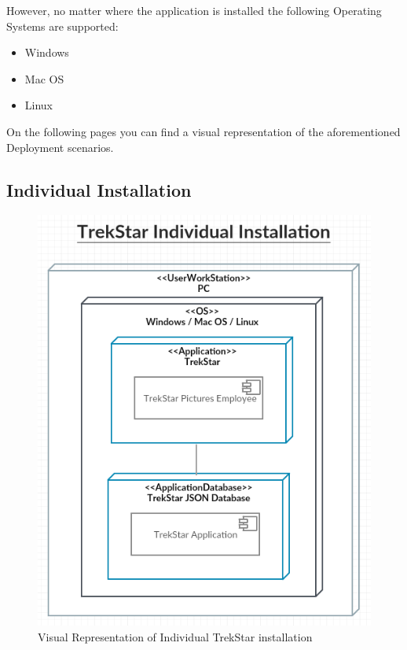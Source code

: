 \documentclass[
  english,
  a4paper,
,tablecaptionabove
]{scrartcl}
\providecommand{\tightlist}{%
  \setlength{\itemsep}{0pt}\setlength{\parskip}{0pt}}
\begin{document}
However, no matter where the application is installed the following
Operating Systems are supported:

\begin{itemize}
\tightlist
\item
  Windows
\item
  Mac OS
\item
  Linux
\end{itemize}

On the following pages you can find a visual representation of the
aforementioned Deployment scenarios.

\hypertarget{individual-installation}{%
\subsection{Individual Installation}\label{individual-installation}}

\begin{figure}
\centering
\includegraphics{images/deployment-diagrams/trekstar-individual-installation.png}
\caption{Visual Representation of Individual TrekStar installation}
\end{figure}
\end{document}
